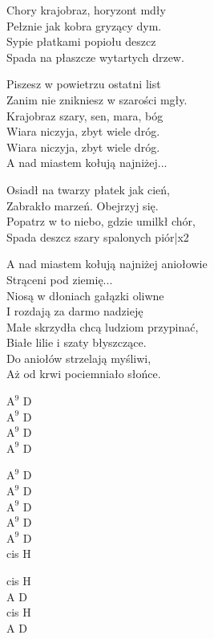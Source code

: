 \begin{text}
    Chory krajobraz, horyzont mdły\\
    Pełznie jak kobra gryzący dym.\\
    Sypie płatkami popiołu deszcz\\
    Spada na płaszcze wytartych drzew.

    Piszesz w powietrzu ostatni list\\
    Zanim nie znikniesz w szarości mgły.\\
    Krajobraz szary, sen, mara, bóg\\
    Wiara niczyja, zbyt wiele dróg.\\
    Wiara niczyja, zbyt wiele dróg.\\
    A nad miastem kołują najniżej...

    Osiadł na twarzy płatek jak cień,\\
    Zabrakło marzeń. Obejrzyj się.\\
    Popatrz w to niebo, gdzie umilkł chór,\\
    Spada deszcz szary spalonych piór|x2

    A nad miastem kołują najniżej aniołowie\\
    Strąceni pod ziemię...\\
    Niosą w dłoniach gałązki oliwne\\
    I rozdają za darmo nadzieję\\
    Małe skrzydła chcą ludziom przypinać,\\
    Białe lilie i szaty błyszczące.\\
    Do aniołów strzelają myśliwi,\\
    Aż od krwi pociemniało słońce.
\end{text}
\begin{chord}
    $\mathrm{A^{9}}$ D\\
    $\mathrm{A^{9}}$ D\\
    $\mathrm{A^{9}}$ D\\
    $\mathrm{A^{9}}$ D

    $\mathrm{A^{9}}$ D\\
    $\mathrm{A^{9}}$ D\\
    $\mathrm{A^{9}}$ D\\
    $\mathrm{A^{9}}$ D\\
    $\mathrm{A^{9}}$ D\\
    cis H

    \hfill\break
    \hfill\break
    \hfill\break
    \hfill\break
    \hfill\break
    cis H\\
    A D\\
    cis H\\
    A D
\end{chord}
